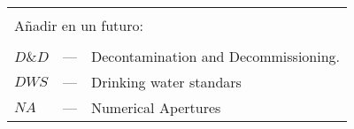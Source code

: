 \begin{longtable}{p{25mm} c p{120mm} }
\\
\\
\multicolumn{3}{l}{Añadir en un futuro:}\\
\\
$D\&D$ & --- & Decontamination and Decommissioning.\\
$DWS$ & --- & Drinking water standars\\


$NA$ & --- & Numerical Apertures\\

\end{longtable}
